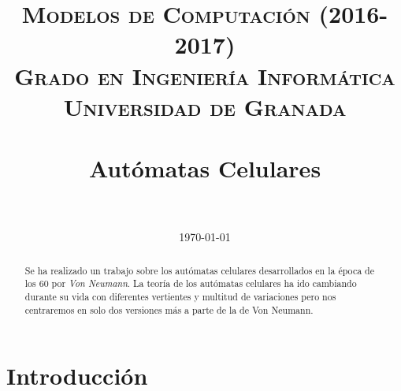


\title{	
\normalfont \normalsize 
\textsc{\textbf{Modelos de Computación (2016-2017)} \\ Grado en Ingeniería Informática \\ Universidad de Granada} \\ [25pt] %
\horrule{0.5pt} \\[0.4cm] %
\huge Autómatas Celulares \\ %
\horrule{2pt} \\[0.5cm] %
}

\date{\normalsize\today} %




\maketitle %

\newpage

\begin{abstract}
Se ha realizado un trabajo sobre los autómatas celulares desarrollados en la época de los 60 por \textit{Von Neumann}. La teoría de los autómatas celulares ha ido cambiando durante su vida con diferentes vertientes y multitud de variaciones pero nos centraremos en solo dos versiones más a parte de la de Von Neumann.



\end{abstract}


\section{Introducción} %

